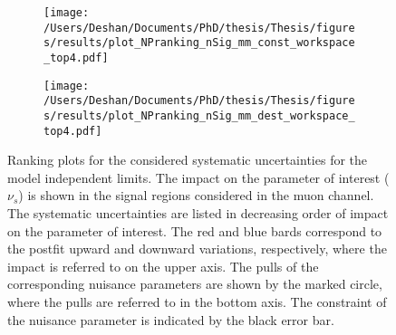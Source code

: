 \begin{figure}[!htpb]
    \centering
    \begin{subfigure}[b]{0.49\textwidth}
        \centering
        \texttt{[image: /Users/Deshan/Documents/PhD/thesis/Thesis/figures/results/plot\_NPranking\_nSig\_mm\_const\_workspace\_top4.pdf]}
        \label{fig:nprankin3}
    \end{subfigure}
    \begin{subfigure}[b]{0.49\textwidth}
        \centering
        \texttt{[image: /Users/Deshan/Documents/PhD/thesis/Thesis/figures/results/plot\_NPranking\_nSig\_mm\_dest\_workspace\_top4.pdf]}
        \label{fig:nprankin4}
    \end{subfigure}
    \caption[Ranking plots for the considered systematic uncertainties for the model independent limits in the muon channel signal regions]{Ranking plots for the considered systematic uncertainties for the model independent limits. The impact on the parameter of interest ($\nu_s$) is shown in the signal regions considered in the muon channel. The systematic uncertainties are listed in decreasing order of impact on the parameter of interest. The red and blue bards correspond to the postfit upward and downward variations, respectively, where the impact is referred to on the upper axis. The pulls of the corresponding nuisance parameters are shown by the marked circle, where the pulls are referred to in the bottom axis. The constraint of the nuisance parameter is indicated by the black error bar. 
    }
    \label{fig:nprankingmm}
\end{figure}
\clearpage

